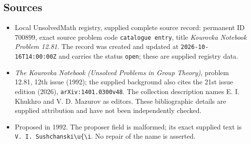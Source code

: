 \documentclass[11pt]{article}
\begin{document}
\subsection{Sources}
\begin{itemize}
\item Local UnsolvedMath registry, supplied complete source record: permanent ID \(700899\), exact source problem code \texttt{catalogue entry}, title \emph{Kourovka Notebook Problem 12.81}. The record was created and updated at \texttt{2026-10-16T14:00:00Z} and carries the status \texttt{open}; these are supplied registry data.
\item \emph{The Kourovka Notebook (Unsolved Problems in Group Theory)}, problem 12.81, 12th issue (1992); the supplied background also cites the 21st issue edition (2026), \texttt{arXiv:1401.0300v48}. The collection description names E. I. Khukhro and V. D. Mazurov as editors. These bibliographic details are supplied attribution and have not been independently checked.
\item Proposed in 1992. The proposer field is malformed; its exact supplied text is \texttt{V. I. Sushchanski\textbackslash{}u\{\textbackslash{}i}. No repair of the name is asserted.
\end{itemize}
\end{document}
